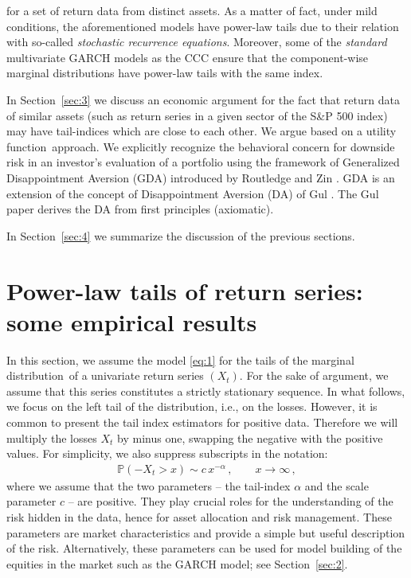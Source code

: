 \documentclass[11pt,a4]{amsart}
\newcommand{\sre}{stochastic recurrence equation}
\newcommand{\beam}{\begin{eqnarray}}
\newcommand{\eeam}{\end{eqnarray}\noindent}
\newcommand{\xto}{x\to\infty}
\newcommand{\fct}{function}
\newcommand{\ds}{distribution}
\newcommand{\seq}{sequence}
\renewcommand{\P }{{\mathbb P}}
\newcommand{\1}{{\mathbf 1}}
\begin{document}
for a set of return data from distinct assets. As a matter of fact, under mild conditions, the aforementioned models
have power-law tails due to their relation with so-called {\em \sre s}. Moreover, some of the {\em standard} multivariate 
GARCH models as the CCC ensure that the component-wise marginal \ds s have power-law tails with the same index.
\par
In Section~\ref{sec:3} we discuss an economic argument for the fact that return data of similar assets
(such as return series in a given sector of the S\&P 500 index) may have tail-indices which are close to each other.
We argue based on a  utility \fct\ approach. We explicitly recognize the behavioral
concern for downside risk in an investor's evaluation of a portfolio
using the framework of Generalized Disappointment Aversion (GDA)
introduced by Routledge and Zin \cite{routledge2010generalized}. GDA
is an extension of the concept of Disappointment Aversion (DA) of Gul \cite{gul:1991}. The Gul paper derives the DA from first principles (axiomatic).
\par 
In Section~\ref{sec:4} we summarize the discussion of the previous
sections. 




\section{Power-law tails of return series: some empirical results}\label{sec:1}\setcounter{equation}{0}
In this section, we assume the model \eqref{eq:1} for the tails of the marginal
\ds\ of a univariate return series $(X_t)$. For the sake of argument, we assume
that this series constitutes a strictly stationary \seq . In what follows, we focus
on the left tail of the \ds , i.e., on the losses. 
However, it is common to present the tail index estimators
for positive data. Therefore we will multiply the losses $X_t$ by
minus one, swapping the negative with the positive values.
For simplicity, we also suppress subscripts in the notation:
\beam\label{eq:1a}
\P(-X_t>x)\sim c\,x^{-\alpha}\,,\qquad \xto\,,
\eeam
where we assume that the two parameters -- the tail-index  $\alpha$ and the scale parameter
$c$ -- are positive. They play crucial roles for the understanding of the risk hidden in the data, hence 
for asset allocation and risk management. These parameters are market characteristics  and provide a simple but 
useful description of the risk. Alternatively, these parameters can be
used for model building of the equities in the market such as the GARCH model; see Section~\ref{sec:2}.
\end{document}
